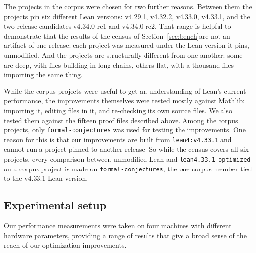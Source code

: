 \documentclass{article}
\newcommand{\Lean}{Lean\xspace}      %
\newcommand{\mathlib}{Mathlib\xspace}
\newcommand{\currentlean}{\texttt{lean4:v4.33.1}\xspace}
\newcommand{\altlean}{\texttt{lean4.33.1-\allowbreak optimized}\xspace}
\begin{document}
The projects in the corpus were chosen for two further reasons. Between them the projects pin six different \Lean versions: v4.29.1, v4.32.2, v4.33.0, v4.33.1, and the two release candidates v4.34.0-rc1 and v4.34.0-rc2. That range is helpful to demonstrate that the results of the census of Section~\ref{sec:bench}are not an artifact of one release: each project was measured under the
\Lean version it pins, unmodified. And the projects are structurally different from one another: some are deep, with files building in long chains, others flat, with a thousand files importing the same thing.

While the corpus projects were useful to get an understanding of \Lean's current performance, the improvements themselves were tested mostly against \mathlib: importing it, editing files in it, and re-checking its own source files. We also tested them against the fifteen proof files described above. Among the corpus projects, only \texttt{formal-conjectures} was used for testing the improvements. One reason for this is that our improvements are built from \currentlean and cannot run a project pinned to another release. So while the census covers all six projects, every comparison between unmodified \Lean and \altlean on a corpus project is made on \texttt{formal-conjectures}, the one corpus member tied to the v4.33.1 \Lean version.

\subsection{Experimental setup}

Our performance measurements were taken on four machines with different hardware parameters, providing a range of results that give a broad sense of the reach of our optimization improvements.
\end{document}
